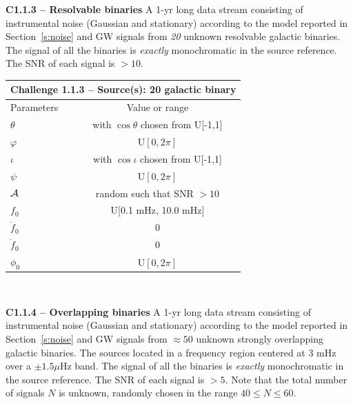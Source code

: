 \documentclass[11pt]{report}
\begin{document}
\begin{description}
\item {\bf C1.1.3 -- Resolvable binaries} A 1-yr long data stream consisting of instrumental noise (Gaussian and stationary) according to the model reported in Section~\ref{s:noise} and GW signals from {\em 20} unknown resolvable galactic binaries. The signal of all the binaries is {\em exactly} monochromatic in the source reference. The SNR of each signal is $> 10$.

\begin{center}
\begin{tabular}{l|c}
\hline \hline
\multicolumn{2}{c}{{\bf Challenge 1.1.3 -- Source(s): 20 galactic binary}} \\
\hline
Parameters & Value or range \\
\hline
$\theta$          & with $\cos\theta$ chosen from U[-1,1]\\
$\varphi$         & U$[0,2\pi]$ \\ 
$\iota$           & with $\cos\iota$ chosen from U[-1,1]\\ 
$\psi$            & U$[0,2\pi]$ \\
${\cal A}$        & random such that SNR $> 10$  \\
$f_0$             & U[0.1 mHz, 10.0 mHz] \\ 
$\dot{f}_0$       & 0 \\ 
$\ddot{f}_0$      & 0\\ 
$\phi_0$          & U$[0,2\pi]$ \\
\hline \hline
\end{tabular} \\
\end{center}

\item {\bf C1.1.4 -- Overlapping binaries} A 1-yr long data stream consisting of instrumental noise (Gaussian and stationary) according to the model reported in Section~\ref{s:noise} and GW signals from $\approx 50$ unknown strongly overlapping galactic binaries. The sources located in a frequency region centered at 3 mHz over a $\pm 1.5 \mu$Hz band. The signal of all the binaries is {\em exactly} monochromatic in the source reference. The SNR of each signal is $> 5$. Note that the total number of signals $N$ is unknown, randomly chosen in the range $40 \le N \le 60$.


\end{description}
\end{document}
